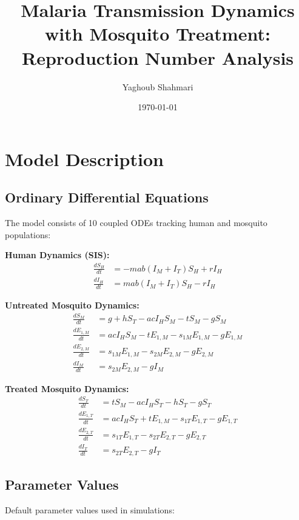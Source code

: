 \documentclass{article}
\title{Malaria Transmission Dynamics with Mosquito Treatment: Reproduction Number Analysis}
\author{Yaghoub Shahmari}
\date{\today}
\begin{document}
\maketitle

\section{Model Description}
\subsection{Ordinary Differential Equations}
The model consists of 10 coupled ODEs tracking human and mosquito populations:

\textbf{Human Dynamics (SIS):}
\begin{align*}
    \frac{dS_H}{dt} &= -m a b (I_M + I_T) S_H + r I_H \\
    \frac{dI_H}{dt} &= m a b (I_M + I_T) S_H - r I_H
\end{align*}

\textbf{Untreated Mosquito Dynamics:}
\begin{align*}
    \frac{dS_M}{dt} &= g + h S_T - a c I_H S_M - t S_M - g S_M \\
    \frac{dE_{1,M}}{dt} &= a c I_H S_M - t E_{1,M} - s_{1M} E_{1,M} - g E_{1,M} \\
    \frac{dE_{2,M}}{dt} &= s_{1M} E_{1,M} - s_{2M} E_{2,M} - g E_{2,M} \\
    \frac{dI_M}{dt} &= s_{2M} E_{2,M} - g I_M
\end{align*}

\textbf{Treated Mosquito Dynamics:}
\begin{align*}
    \frac{dS_T}{dt} &= t S_M - a c I_H S_T - h S_T - g S_T \\
    \frac{dE_{1,T}}{dt} &= a c I_H S_T + t E_{1,M} - s_{1T} E_{1,T} - g E_{1,T} \\
    \frac{dE_{2,T}}{dt} &= s_{1T} E_{1,T} - s_{2T} E_{2,T} - g E_{2,T} \\
    \frac{dI_T}{dt} &= s_{2T} E_{2,T} - g I_T
\end{align*}

\subsection{Parameter Values}
Default parameter values used in simulations:
\end{document}
